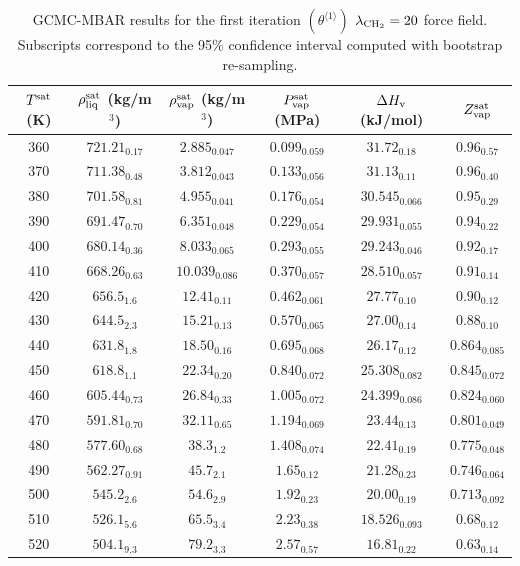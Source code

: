 \documentclass[journal=jctc,manuscript=article]{achemso}
\begin{document}
	\begin{table}[htb!]
		\caption{GCMC-MBAR results for the first iteration $(\theta^{\langle1\rangle})$ $\lambda_{\rm CH_2} = 20$ force field. Subscripts correspond to the 95\% confidence interval computed with bootstrap re-sampling.}
		\begin{center}
			\begin{tabular}{|c|c|c|c|c|c|}
				\hline
				$T^{\rm sat}$ (K) & $\rho_{\rm liq}^{\rm sat}$ (kg/m$^3$) & $\rho_{\rm vap}^{\rm sat}$ (kg/m$^3$) & $P_{\rm vap}^{\rm sat}$ (MPa) & $\Delta H_{\rm v}$ (kJ/mol) & $Z_{\rm vap}^{\rm sat}$ \\ \hline
				360 & $721.21_{0.17}$ & $2.885_{0.047}$ & $0.099_{0.059}$ & $31.72_{0.18}$ & $0.96_{0.57}$ \\
				370 & $711.38_{0.48}$ & $3.812_{0.043}$ & $0.133_{0.056}$ & $31.13_{0.11}$ & $0.96_{0.40}$ \\
				380 & $701.58_{0.81}$ & $4.955_{0.041}$ & $0.176_{0.054}$ & $30.545_{0.066}$ & $0.95_{0.29}$ \\
				390 & $691.47_{0.70}$ & $6.351_{0.048}$ & $0.229_{0.054}$ & $29.931_{0.055}$ & $0.94_{0.22}$ \\
				400 & $680.14_{0.36}$ & $8.033_{0.065}$ & $0.293_{0.055}$ & $29.243_{0.046}$ & $0.92_{0.17}$ \\
				410 & $668.26_{0.63}$ & $10.039_{0.086}$ & $0.370_{0.057}$ & $28.510_{0.057}$ & $0.91_{0.14}$ \\
				420 & $656.5_{1.6}$ & $12.41_{0.11}$ & $0.462_{0.061}$ & $27.77_{0.10}$ & $0.90_{0.12}$ \\
				430 & $644.5_{2.3}$ & $15.21_{0.13}$ & $0.570_{0.065}$ & $27.00_{0.14}$ & $0.88_{0.10}$ \\
				440 & $631.8_{1.8}$ & $18.50_{0.16}$ & $0.695_{0.068}$ & $26.17_{0.12}$ & $0.864_{0.085}$ \\
				450 & $618.8_{1.1}$ & $22.34_{0.20}$ & $0.840_{0.072}$ & $25.308_{0.082}$ & $0.845_{0.072}$ \\
				460 & $605.44_{0.73}$ & $26.84_{0.33}$ & $1.005_{0.072}$ & $24.399_{0.086}$ & $0.824_{0.060}$ \\
				470 & $591.81_{0.70}$ & $32.11_{0.65}$ & $1.194_{0.069}$ & $23.44_{0.13}$ & $0.801_{0.049}$ \\
				480 & $577.60_{0.68}$ & $38.3_{1.2}$ & $1.408_{0.074}$ & $22.41_{0.19}$ & $0.775_{0.048}$ \\
				490 & $562.27_{0.91}$ & $45.7_{2.1}$ & $1.65_{0.12}$ & $21.28_{0.23}$ & $0.746_{0.064}$ \\
				500 & $545.2_{2.6}$ & $54.6_{2.9}$ & $1.92_{0.23}$ & $20.00_{0.19}$ & $0.713_{0.092}$ \\
				510 & $526.1_{5.6}$ & $65.5_{3.4}$ & $2.23_{0.38}$ & $18.526_{0.093}$ & $0.68_{0.12}$ \\
				520 & $504.1_{9.3}$ & $79.2_{3.3}$ & $2.57_{0.57}$ & $16.81_{0.22}$ & $0.63_{0.14}$ \\
				\hline
			\end{tabular}
		\end{center}
	\end{table}
\end{document}
